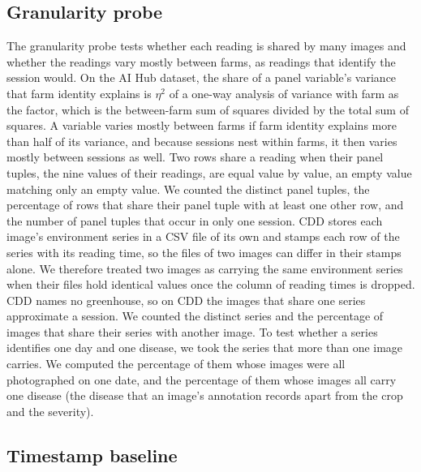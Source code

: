 \documentclass[preprint,12pt,authoryear,nopreprintline]{elsarticle}
\begin{document}
\subsection{Granularity probe}
\label{sec:diagnostic}

The granularity probe tests whether each reading is shared by many images and whether
the readings vary mostly between farms, as readings that identify the session would.
On the AI Hub dataset, the share of a panel variable's variance that farm identity
explains is $\eta^2$ of a one-way analysis of variance with farm as the factor, which is
the between-farm sum of squares divided by the total sum of squares. A variable varies
mostly between farms if farm identity explains more than half of its variance, and
because sessions nest within farms, it then varies mostly between sessions as well.
Two rows share a reading when their panel tuples, the nine values of their readings, are
equal value by value, an empty value matching only an empty value. We counted the distinct panel tuples, the
percentage of rows that share their panel tuple with at least one other row, and the
number of panel tuples that occur in only one session. CDD stores each image's
environment series in a CSV file of its own and stamps each row of the series with
its reading time, so the files of two images can differ in their stamps alone. We
therefore treated two images as carrying the same environment series when their files
hold identical values once the column of reading times is dropped. CDD names no
greenhouse, so on CDD the images that share one series approximate a session. We
counted the distinct series and the percentage of images that share their series with
another image. To test whether a series identifies one day and one disease, we took
the series that more than one image carries. We computed the percentage of them whose
images were all photographed on one date, and the percentage of them whose images all
carry one disease (the disease that an image's annotation records apart from the crop
and the severity).

\subsection{Timestamp baseline}
\label{sec:timestamp-methods}
\end{document}
